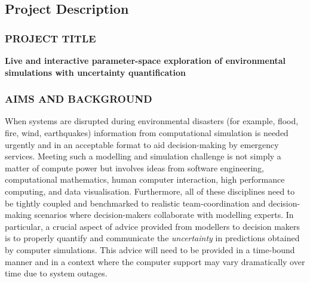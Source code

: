 \documentclass[a4paper,fontsize=13pt]{scrartcl}
\author{}
\date{\today}
\begin{document}
\renewcommand{\thesection}{\Alph{section}}

\setcounter{section}{3} %
\subsection{Project Description}
\label{sec:project-description}

\subsubsection*{PROJECT TITLE}

\textbf{Live and interactive parameter-space exploration of environmental simulations with uncertainty quantification} %



\subsubsection*{AIMS AND BACKGROUND}



When systems are disrupted during environmental disasters (for example,
flood, fire, wind, earthquakes) information from
computational simulation is needed urgently and in an
acceptable format to aid  decision-making by emergency services. 
Meeting such a modelling and simulation 
challenge is not simply a matter of compute power but involves
ideas from software engineering, computational mathematics,
human computer interaction, high performance computing, and data visualisation. Furthermore, all
of these disciplines need to be tightly coupled and benchmarked to
realistic  team-coordination and decision-making scenarios where decision-makers collaborate with modelling experts. 
In particular, 
a crucial aspect of advice provided from modellers to decision makers is to properly quantify and communicate 
the {\em uncertainty} in predictions obtained
by computer simulations. This advice will need to be provided in a time-bound manner and in a context where the computer support may vary dramatically over time due to system outages.
\end{document}

